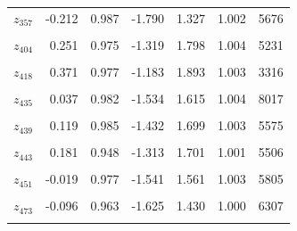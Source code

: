 \begin{longtable}{lrrrrrr}
$z_{357}$ & -0.212 & 0.987 & -1.790 & 1.327 & 1.002 & 5676\\
\cellcolor{gray!10}{$z_{362}$} & \cellcolor{gray!10}{-0.021} & \cellcolor{gray!10}{1.020} & \cellcolor{gray!10}{-1.645} & \cellcolor{gray!10}{1.580} & \cellcolor{gray!10}{1.005} & \cellcolor{gray!10}{7100}\\
$z_{404}$ & 0.251 & 0.975 & -1.319 & 1.798 & 1.004 & 5231\\
\cellcolor{gray!10}{$z_{411}$} & \cellcolor{gray!10}{-0.042} & \cellcolor{gray!10}{0.981} & \cellcolor{gray!10}{-1.608} & \cellcolor{gray!10}{1.499} & \cellcolor{gray!10}{1.002} & \cellcolor{gray!10}{7494}\\
$z_{418}$ & 0.371 & 0.977 & -1.183 & 1.893 & 1.003 & 3316\\
\cellcolor{gray!10}{$z_{427}$} & \cellcolor{gray!10}{0.071} & \cellcolor{gray!10}{0.976} & \cellcolor{gray!10}{-1.461} & \cellcolor{gray!10}{1.614} & \cellcolor{gray!10}{1.002} & \cellcolor{gray!10}{6177}\\
$z_{435}$ & 0.037 & 0.982 & -1.534 & 1.615 & 1.004 & 8017\\
\cellcolor{gray!10}{$z_{436}$} & \cellcolor{gray!10}{0.044} & \cellcolor{gray!10}{0.986} & \cellcolor{gray!10}{-1.520} & \cellcolor{gray!10}{1.636} & \cellcolor{gray!10}{1.002} & \cellcolor{gray!10}{7354}\\
$z_{439}$ & 0.119 & 0.985 & -1.432 & 1.699 & 1.003 & 5575\\
\cellcolor{gray!10}{$z_{440}$} & \cellcolor{gray!10}{0.081} & \cellcolor{gray!10}{0.977} & \cellcolor{gray!10}{-1.477} & \cellcolor{gray!10}{1.649} & \cellcolor{gray!10}{1.003} & \cellcolor{gray!10}{6949}\\
$z_{443}$ & 0.181 & 0.948 & -1.313 & 1.701 & 1.001 & 5506\\
\cellcolor{gray!10}{$z_{446}$} & \cellcolor{gray!10}{-0.213} & \cellcolor{gray!10}{0.953} & \cellcolor{gray!10}{-1.750} & \cellcolor{gray!10}{1.313} & \cellcolor{gray!10}{1.003} & \cellcolor{gray!10}{5265}\\
$z_{451}$ & -0.019 & 0.977 & -1.541 & 1.561 & 1.003 & 5805\\
\cellcolor{gray!10}{$z_{453}$} & \cellcolor{gray!10}{-0.014} & \cellcolor{gray!10}{1.013} & \cellcolor{gray!10}{-1.631} & \cellcolor{gray!10}{1.599} & \cellcolor{gray!10}{1.002} & \cellcolor{gray!10}{4913}\\
$z_{473}$ & -0.096 & 0.963 & -1.625 & 1.430 & 1.000 & 6307\\
\cellcolor{gray!10}{$z_{474}$} & \cellcolor{gray!10}{-0.088} & \cellcolor{gray!10}{0.961} & \cellcolor{gray!10}{-1.668} & \cellcolor{gray!10}{1.429} & \cellcolor{gray!10}{1.002} & \cellcolor{gray!10}{8049}\\

\end{longtable}
